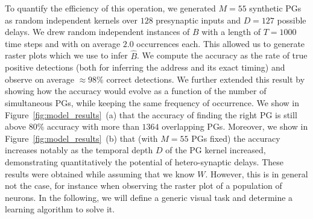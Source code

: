 \documentclass[default]{sn-jnl}%
\theoremstyle{thmstyleone}%
\theoremstyle{thmstyletwo}%
\theoremstyle{thmstylethree}%
\begin{document}
To quantify the efficiency of this operation, we generated $M=55$ synthetic PGs as random independent kernels over $128$ presynaptic inputs and $D=127$ possible delays. We drew random independent instances of $B$ with a length of $T=1000$ time steps and with on average $2.0$ occurrences each. This allowed us to generate raster plots which we use to infer $\hat{B}$. We compute the accuracy as the rate of true positive detections (both for inferring the address and its exact timing) and observe on average $\approx 98\%$ correct detections. We further extended this result by showing how the accuracy would evolve as a function of the number of simultaneous PGs, while keeping the same frequency of occurrence. We show in Figure~\ref{fig:model_results}~(a) that the accuracy of finding the right PG is still above $80\%$ accuracy with more than $1364$ overlapping PGs. Moreover, we show in Figure~\ref{fig:model_results}~(b) that (with $M=55$ PGs fixed) the accuracy increases notably as the temporal depth $D$ of the PG kernel increased, demonstrating quantitatively the potential of hetero-synaptic delays. These results were obtained while assuming that we know $W$. However, this is in general not the case, for instance when observing the raster plot of a population of neurons. In the following, we will define a generic visual task and determine a learning algorithm to solve it. %
    
\end{document}
